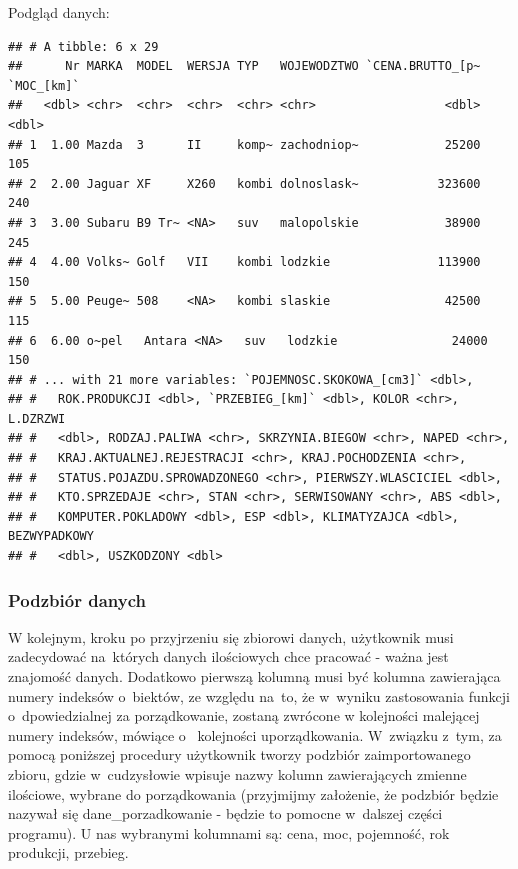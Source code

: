 \documentclass[12pt,a4paper]{report}
\begin{document}
{Podgląd danych:

\begin{Shaded}
\begin{Highlighting}[]
\end{Highlighting}
\end{Shaded}

\begin{verbatim}
## # A tibble: 6 x 29
##      Nr MARKA  MODEL  WERSJA TYP   WOJEWODZTWO `CENA.BRUTTO_[p~ `MOC_[km]`
##   <dbl> <chr>  <chr>  <chr>  <chr> <chr>                  <dbl>      <dbl>
## 1  1.00 Mazda  3      II     komp~ zachodniop~            25200        105
## 2  2.00 Jaguar XF     X260   kombi dolnoslask~           323600        240
## 3  3.00 Subaru B9 Tr~ <NA>   suv   malopolskie            38900        245
## 4  4.00 Volks~ Golf   VII    kombi lodzkie               113900        150
## 5  5.00 Peuge~ 508    <NA>   kombi slaskie                42500        115
## 6  6.00 o~pel   Antara <NA>   suv   lodzkie                24000        150
## # ... with 21 more variables: `POJEMNOSC.SKOKOWA_[cm3]` <dbl>,
## #   ROK.PRODUKCJI <dbl>, `PRZEBIEG_[km]` <dbl>, KOLOR <chr>, L.DZRZWI
## #   <dbl>, RODZAJ.PALIWA <chr>, SKRZYNIA.BIEGOW <chr>, NAPED <chr>,
## #   KRAJ.AKTUALNEJ.REJESTRACJI <chr>, KRAJ.POCHODZENIA <chr>,
## #   STATUS.POJAZDU.SPROWADZONEGO <chr>, PIERWSZY.WLASCICIEL <dbl>,
## #   KTO.SPRZEDAJE <chr>, STAN <chr>, SERWISOWANY <chr>, ABS <dbl>,
## #   KOMPUTER.POKLADOWY <dbl>, ESP <dbl>, KLIMATYZAJCA <dbl>, BEZWYPADKOWY
## #   <dbl>, USZKODZONY <dbl>
\end{verbatim}

\subsubsection{Podzbiór danych}\label{podzbior-danych}

W kolejnym, kroku po przyjrzeniu się zbiorowi danych, użytkownik musi
zadecydować na~których danych ilościowych chce pracować - ważna jest
znajomość danych. Dodatkowo pierwszą kolumną musi być kolumna
zawierająca numery indeksów o~biektów, ze względu na~to, że w~wyniku
zastosowania funkcji o~dpowiedzialnej za porządkowanie, zostaną zwrócone
w kolejności malejącej numery indeksów, mówiące o~ kolejności
uporządkowania. W~związku z~tym, za pomocą poniższej procedury
użytkownik tworzy podzbiór zaimportowanego zbioru, gdzie w~cudzysłowie
wpisuje nazwy kolumn zawierających zmienne ilościowe, wybrane do
porządkowania (przyjmijmy założenie, że podzbiór będzie nazywał się
dane\_porzadkowanie - będzie to pomocne w~dalszej części programu). U
nas wybranymi kolumnami są: cena, moc, pojemność, rok produkcji,
przebieg.

}
\end{document}

